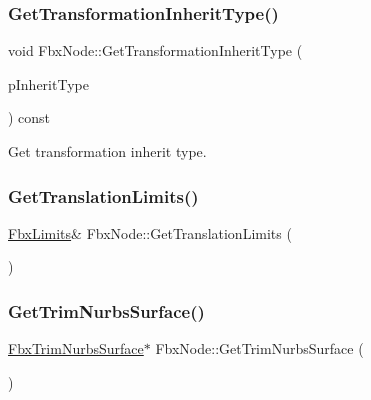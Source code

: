 \mbox{\label{class_fbx_node_a7df3b59153a6183988ea20c52ee7df9f}} 
\subsubsection{\texorpdfstring{Get\+Transformation\+Inherit\+Type()}{GetTransformationInheritType()}}
{\footnotesize\ttfamily void Fbx\+Node\+::\+Get\+Transformation\+Inherit\+Type (\begin{DoxyParamCaption}\item[{\hyperlink{class_fbx_transform_ac1ab8f75b4873723daa68c57f999b10f}{Fbx\+Transform\+::\+E\+Inherit\+Type} \&}]{p\+Inherit\+Type }\end{DoxyParamCaption}) const}



Get transformation inherit type. 

\mbox{\label{class_fbx_node_a603deba5c6f52eda24f35356add8e8b6}} 
\subsubsection{\texorpdfstring{Get\+Translation\+Limits()}{GetTranslationLimits()}}
{\footnotesize\ttfamily \hyperlink{class_fbx_limits}{Fbx\+Limits}\& Fbx\+Node\+::\+Get\+Translation\+Limits (\begin{DoxyParamCaption}{ }\end{DoxyParamCaption})}

\mbox{\label{class_fbx_node_a62a5a3fc9010e5686639bc714d2a29f6}} 
\subsubsection{\texorpdfstring{Get\+Trim\+Nurbs\+Surface()}{GetTrimNurbsSurface()}}
{\footnotesize\ttfamily \hyperlink{class_fbx_trim_nurbs_surface}{Fbx\+Trim\+Nurbs\+Surface}$\ast$ Fbx\+Node\+::\+Get\+Trim\+Nurbs\+Surface (\begin{DoxyParamCaption}{ }\end{DoxyParamCaption})}

